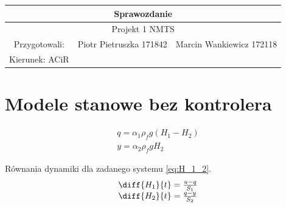 \documentclass{article}
\begin{document}
\begin{tabular}{|c|c|c|}
\hline 
\multicolumn{3}{|c|}{\huge Sprawozdanie } \\ 
\hline 
\multicolumn{3}{|c|}{\LARGE Projekt 1  NMTS} \\ 
\hline 
\Large Przygotowali: &\Large Piotr Pietruszka 171842 &\Large Marcin Wankiewicz 172118  \\ 
\hline 
\Large Kierunek: ACiR  \\ 
\hline 
 
\end{tabular} 

\section{Modele stanowe bez kontrolera}
\begin{equation}\label{eq:q_y}
 \begin{array}{l}
  q = \alpha_1 \rho_f g (H_1 - H_2) \\
  y = \alpha_2 \rho_f g H_2
\end{array}
\end{equation}

Równania dynamiki dla zadanego systemu  \ref{eq:H_1_2}.
\begin{equation}\label{eq:H_1_2}
 \begin{array}{l}
  \diff{H_1}{t} = \frac{u-q}{S_1} \\
  \diff{H_2}{t} = \frac{q-y}{S_2}
 \end{array}
\end{equation}
\end{document}
